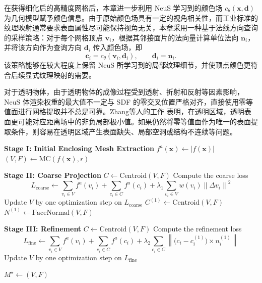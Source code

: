 在获得细化后的高精度网格后，本章进一步利用 NeuS 学习到的颜色场 $c_\theta(\mathbf{x}, \mathbf{d})$ 为几何模型赋予颜色信息。由于原始颜色场具有一定的视角相关性，而工业标准的纹理映射通常要求表面属性尽可能保持视角无关，本章采用一种基于法线方向查询的采样策略：对于每个网格顶点 $\mathbf{v}_i$，根据其邻接面片的法向量计算单位法向 $\mathbf{n}_i$，并将该方向作为查询方向 $\mathbf{d}_i$ 传入颜色场，即
\[
\mathbf{c}_i = c_\theta(\mathbf{v}_i, \mathbf{d}_i), \qquad \mathbf{d}_i = \mathbf{n}_i .
\]
该策略能够在较大程度上保留 NeuS 所学习到的局部纹理细节，并使顶点颜色更符合后续显式纹理映射的需要。

对于透明物体，由于透明物体的成像过程受到透射、折射和反射等因素影响，NeuS 体渲染权重的最大值不一定与 SDF 的零交叉位置严格对齐，直接使用零等值面进行网格提取并不总是可靠。Zhang等人的工作\cite{zhang2024alphaneus} 表明，在透明区域，透明表面更可能对应距离场中的非负局部极小值。如果仍然将零等值面作为唯一的表面提取条件，则容易在透明区域产生表面缺失、局部空洞或结构不连续等问题。



\begin{algorithm}[!t]
\caption{透明物体表面提取算法流程}
\label{algo:transparent_surface_extraction}
\begin{algorithmic}[1]
\STATE \textbf{Stage I: Initial Enclosing Mesh Extraction}
\STATE $f^{a}(\mathbf{x}) \gets |f(\mathbf{x})|$
\STATE $(V,F) \gets \mathrm{MC}(f(\mathbf{x}), r)$

\STATE
\STATE \textbf{Stage II: Coarse Projection}
    \STATE $C \gets \mathrm{Centroid}(V,F)$
    \STATE Compute the coarse loss
    \[
    L_{\mathrm{coarse}}
    \gets
    \sum_{v_i \in V} f^{a}(v_i)
    +
    \sum_{c_i \in C} f^{a}(c_i)
    +
    \lambda_1 \sum_{v_i \in V} w(v_i)\left\|\Delta v_i\right\|^2
    \]
    \STATE Update $V$ by one optimization step on $L_{\mathrm{coarse}}$
\ENDFOR
\STATE $C^{(1)} \gets \mathrm{Centroid}(V,F)$
\STATE $N^{(1)} \gets \mathrm{FaceNormal}(V,F)$

\STATE
\STATE \textbf{Stage III: Refinement}
    \STATE $C \gets \mathrm{Centroid}(V,F)$
    \STATE Compute the refinement loss
    \[
    L_{\mathrm{fine}}
    \gets
    \sum_{v_i \in V} f^{a}(v_i)
    +
    \sum_{c_i \in C} f^{a}(c_i)
    +
    \lambda_2 \sum_{c_i \in C}
    \left\|
    \bigl(c_i-c_i^{(1)}\bigr)\times n_i^{(1)}
    \right\|
    \]
    \STATE Update $V$ by one optimization step on $L_{\mathrm{fine}}$
\ENDFOR

\STATE $M^\star \gets (V,F)$

\end{algorithmic}
\end{algorithm}



